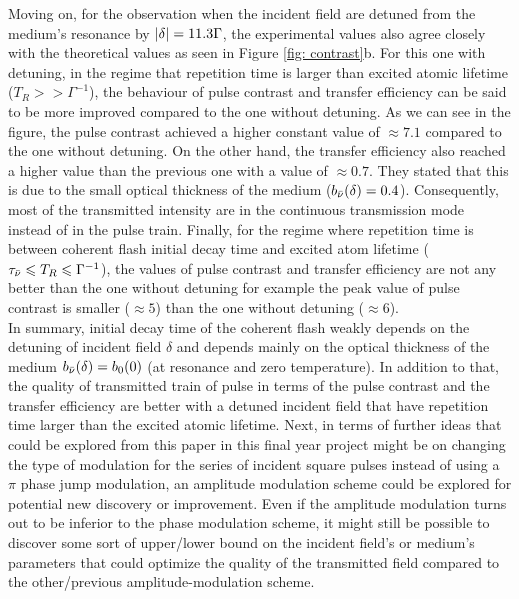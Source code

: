 Moving on, for the observation when the incident field are detuned from the medium's resonance by $\abs{\delta} = 11.3 \Gamma$, the experimental values also agree closely with the theoretical values as seen in Figure \ref{fig: contrast}b. For this one with detuning, in the regime that repetition time is larger than excited atomic lifetime ($T_{R} >> \Gamma^{-1}$), the behaviour of pulse contrast and transfer efficiency can be said to be more improved compared to the one without detuning. As we can see in the figure, the pulse contrast achieved a higher constant value of $\approx 7.1$ compared to the one without detuning. On the other hand, the transfer efficiency also reached a higher value than the previous one with a value of $\approx 0.7$. They stated that this is due to the small optical thickness of the medium ($b_{\Bar{\nu}}(\delta) = 0.4$). Consequently, most of the transmitted intensity are in the continuous transmission mode instead of in the pulse train. Finally, for the regime where repetition time is between coherent flash initial decay time and excited atom lifetime ($\tau_{\Bar{\nu}} \leqslant T_{R} \leqslant \Gamma^{-1}$), the values of pulse contrast and transfer efficiency are not any better than the one without detuning for example the peak value of pulse contrast is smaller ($\approx 5$) than the one without detuning ($\approx 6$).\\

In summary, initial decay time of the coherent flash weakly depends on the detuning of incident field $\delta$ and depends mainly on the optical thickness of the medium $b_{\Bar{\nu}}(\delta) = b_{0}(0)$ (at resonance and zero temperature). In addition to that, the quality of transmitted train of pulse in terms of the pulse contrast and the transfer efficiency are better with a detuned incident field that have repetition time larger than the excited atomic lifetime. Next, in terms of further ideas that could be explored from this paper in this final year project might be on changing the type of modulation for the series of incident square pulses instead of using a $\pi$ phase jump modulation, an amplitude modulation scheme could be explored for potential new discovery or improvement. Even if the amplitude modulation turns out to be inferior to the phase modulation scheme, it might still be possible to discover some sort of upper/lower bound on the incident field's or medium's parameters that could optimize the quality of the transmitted field compared to the other/previous amplitude-modulation scheme.
